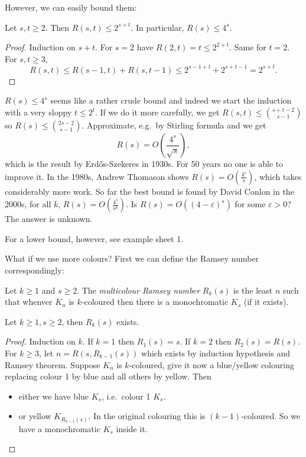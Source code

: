 \documentclass[a4paper]{article}
\begin{document}
However, we can easily bound them:

\begin{corollary}
  Let \(s, t \geq 2\). Then \(R(s, t) \leq 2^{s + t}\). In particular, \(R(s) \leq 4^s\).
\end{corollary}

\begin{proof}
  Induction on \(s + t\). For \(s = 2\) have \(R(2, t) = t \leq 2^{2 + t}\). Same for \(t = 2\). For \(s, t \geq 3\),
  \[
    R(s, t) \leq R(s - 1, t) + R(s, t - 1) \leq 2^{s - 1 + t} + 2^{s + t - 1} = 2^{s + t}.
  \]
\end{proof}

\(R(s) \leq 4^s\) seems like a rather crude bound and indeed we start the induction with a very sloppy \(t \leq 2^t\). If we do it more carefully, we get \(R(s, t) \leq \binom{s + t - 2}{s - 1}\) so \(R(s) \leq \binom{2s - 2}{s - 1}\). Approximate, e.g.\ by Stirling formula and we get
\[
  R(s) = O(\frac{4^s}{\sqrt s}),
\]
which is the result by Erdős-Szekeres in 1930s. For 50 years no one is able to improve it. In the 1980s, Andrew Thomason shows \(R(s) = O(\frac{4^s}{s})\), which takes considerably more work. So far the best bound is found by David Conlon in the 2000s, for all \(k\), \(R(s) = O(\frac{4^s}{s^k})\). Is \(R(s) = O((4 - \varepsilon)^s)\) for some \(\varepsilon > 0\)? The answer is unknown.

For a lower bound, however, see example sheet 1.

What if we use more colours? First we can define the Ramsey number correspondingly:

\begin{definition}
  Let \(k \geq 1\) and \(s \geq 2\). The \emph{multicolour Ramsey number} \(R_k(s)\) is the least \(n\) such that whenver \(K_n\) is \(k\)-coloured then there is a monochromatic \(K_s\) (if it exists).
\end{definition}

\begin{theorem}
  Let \(k \geq 1, s \geq 2\), then \(R_k(s)\) exists.
\end{theorem}

\begin{proof}
  Induction on \(k\). If \(k = 1\) then \(R_1(s) = s\). If \(k = 2\) then \(R_2(s) = R(s)\). For \(k \geq 3\), let \(n = R(s, R_{k - 1}(s))\) which exists by induction hypothesis and Ramsey theorem. Suppose \(K_n\) is \(k\)-coloured, give it now a blue/yellow colouring replacing colour 1 by blue and all others by yellow. Then
  \begin{itemize}
  \item either we have blue \(K_s\), i.e.\ colour 1 \(K_s\).
  \item or yellow \(K_{R_{k - 1}(s)}\). In the original colouring this is \((k - 1)\)-coloured. So we have a monochromatic \(K_s\) inside it.
  \end{itemize}
\end{proof}
\end{document}
